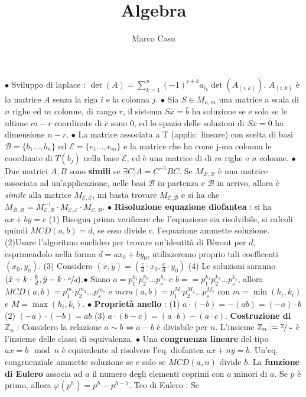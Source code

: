 \documentclass[1pt, letterpaper]{article}
\title{Algebra}
\author{Marco Casu}
\date{\vspace{-5ex}}
\newcommand{\Z}{{\mathbb Z}}
\newcommand{\E}{{\mathcal E}}
\newcommand{\B}{{\mathcal B}}
\newcommand{\fdot}{{\(\bullet\) }}
\begin{document}
\newcommand{\omo}[1]{\(\varphi\)}


\(\bullet\) Sviluppo di laplace : \(\det(A)=\displaystyle\sum_{k=1}^n(-1)^{i+k}a_{i_k}\det(A_{(i,k)})\). \(A_{(i,k)}\) è la matrice \(A\) senza la riga \(i\) e la colonna \(j\). \fdot Sia \(S\in M_{n,m}\) una matrice a 
scala di \(n\) righe ed \(m\) colonne, di rango \(r\), il sistema \(S\bar x=\bar b\) ha soluzione se e solo se le ultime \(m-r\) coordinate di \(\bar c\) sono 0, ed lo spazio delle soluzioni di \(S\bar x = \bar 0\) ha 
dimensione \(n-r\). \fdot La matrice associata a T (applic. lineare) con scelta di basi \(\B=\{b_1\dots,b_n\}\) ed \(\E=\{e_1\dots,e_m\}\) e la matrice che ha come j-ma colonna le coordinate di \(T(b_j)\) 
nella base \(\E\), ed è una matrice di di \(m\) righe e \(n\) colonne. \fdot Due matrici \(A,B\) sono \textbf{simili} se  \(\exists C|A=C^{-1}BC\). Se \(M_{\B,\B}\) è una matrice associata ad un'applicazione, 
nelle basi \(\B\) in partenza e \(\B\) in arrivo, allora è \textit{simile} alla matrice \(M_{\E,\E}\), mi basta trovare \(M_{\E,\B}\) e si ha che \(M_{\B,\B}=M_{\E,\B}^{-1}\cdot M_{\E,\E}\cdot M_{\E,\B}\).
\fdot \textbf{Risoluzione equazione diofantea} : si ha \(ax + by = c\) (1)  Bisogna prima verificare che l’equazione sia risolvibile, si calcoli quindi
\(MCD(a, b) = d\), se esso divide c, l’equazione ammette soluzione. (2)Usare l’algoritmo euclideo per trovare un’identità di Bèzout per \(d\), esprimendolo
nella forma \(d = ax_0 + by_0\), utilizzeremo proprio tali coefficenti \((x_0, y_0)\). (3) Considero \((\tilde x,\tilde y)=(\frac{c}{d}\cdot x_0,\frac{c}{d}\cdot y_0)\) (4) Le soluzioni saranno 
\((\tilde x+k\cdot \frac{b}{d},\tilde y -k\cdot \nicefrac{a}{d} )\).\fdot Siano \(a=p_1^{h_1}p_2^{h_2}\dots p_s^{h_s}\) e \(b==p_1^{k_1}p_2^{k_2}\dots p_s^{k_s}\), allora 
\(MCD(a,b)=p_1^{m_1}p_2^{m_2}\dots p_s^{m_s}\) e \(mcm(a,b)=p_1^{M_1}p_2^{M_2}\dots p_s^{M_s}\) con \(m=\min(h_i,k_i)\) e \(M=\max(h_i,k_i)\). \fdot \textbf{Proprietà anello} : (1) \(a\cdot(-b)=-(ab)=(-a)\cdot b\)
 (2) \((-a)\cdot (-b) = ab\) (3) \(a\cdot(b-c)=(a\cdot b)-(a\cdot c)\). \textbf{Costruzione di \(\Z_n\)} : Considero la relazione \(a\sim b\iff a-b\) è divisbile per \(n\). L'insieme \(\Z_n:=\nicefrac{\Z}{\sim}\) 
 è l'insieme delle classi di equivalenza. \fdot Una \textbf{congruenza lineare} del tipo \(ax=b\mod n\) è equivalente al risolvere l'eq. diofantea \(ax+ny=b\). Un'eq. congruenziale ammette soluzione se e solo 
 se \(MCD(a,n)\) divide \(b\). La \textbf{funzione di Eulero} associa ad \(a\) il numero degli elementi coprimi con \(a\) minori di \(a\). Se \(p\) è primo, allora \(\varphi(p^h)=p^h-p^{h-1}\). Teo di Eulero : Se 
\end{document}
